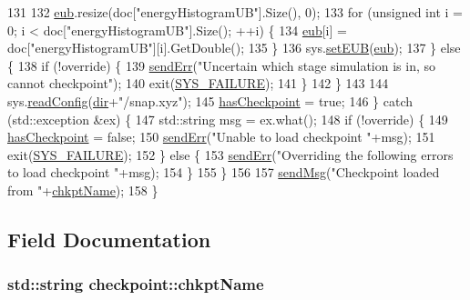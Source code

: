 \begin{DoxyCode}
131 
132             \hyperlink{classcheckpoint_a7071b01d0936873321d0a706e761b6ac}{eub}.resize(doc[\textcolor{stringliteral}{"energyHistogramUB"}].Size(), 0);
133             \textcolor{keywordflow}{for} (\textcolor{keywordtype}{unsigned} \textcolor{keywordtype}{int} i = 0; i < doc[\textcolor{stringliteral}{"energyHistogramUB"}].Size(); ++i) \{
134                 \hyperlink{classcheckpoint_a7071b01d0936873321d0a706e761b6ac}{eub}[i] = doc[\textcolor{stringliteral}{"energyHistogramUB"}][i].GetDouble();
135             \}
136             sys.\hyperlink{classsim_system_ab894de5ccd37efa97ae799f1dc1875a1}{setEUB}(\hyperlink{classcheckpoint_a7071b01d0936873321d0a706e761b6ac}{eub});
137         \} \textcolor{keywordflow}{else} \{
138             \textcolor{keywordflow}{if} (!\textcolor{keyword}{override}) \{
139                 \hyperlink{utilities_8cpp_a6dacf3c3c19aa1e13a4d5a148fe5114e}{sendErr}(\textcolor{stringliteral}{"Uncertain which stage simulation is in, so cannot checkpoint"});
140                 exit(\hyperlink{global_8h_a428dfe1ef0a6ff4b1fdebf275f6aff2e}{SYS\_FAILURE});
141             \}
142         \}
143 
144         sys.\hyperlink{classsim_system_a3161d95bbb800d5d95a732ac5fc32b95}{readConfig}(\hyperlink{classcheckpoint_a0e0f999ee8e0b09541e9131baa8a591d}{dir}+\textcolor{stringliteral}{"/snap.xyz"});
145         \hyperlink{classcheckpoint_aa75f306fcb0c2360d948fa3a61adfed5}{hasCheckpoint} = \textcolor{keyword}{true};
146     \} \textcolor{keywordflow}{catch} (std::exception &ex) \{
147         std::string msg = ex.what();
148         \textcolor{keywordflow}{if} (!\textcolor{keyword}{override}) \{
149             \hyperlink{classcheckpoint_aa75f306fcb0c2360d948fa3a61adfed5}{hasCheckpoint} = \textcolor{keyword}{false};
150             \hyperlink{utilities_8cpp_a6dacf3c3c19aa1e13a4d5a148fe5114e}{sendErr}(\textcolor{stringliteral}{"Unable to load checkpoint "}+msg);
151             exit(\hyperlink{global_8h_a428dfe1ef0a6ff4b1fdebf275f6aff2e}{SYS\_FAILURE});
152         \} \textcolor{keywordflow}{else} \{
153             \hyperlink{utilities_8cpp_a6dacf3c3c19aa1e13a4d5a148fe5114e}{sendErr}(\textcolor{stringliteral}{"Overriding the following errors to load checkpoint "}+msg);
154         \}
155     \}
156 
157     \hyperlink{utilities_8cpp_a08974c73a5b36c28b8ad1ef47fca77b0}{sendMsg}(\textcolor{stringliteral}{"Checkpoint loaded from "}+\hyperlink{classcheckpoint_a477eea21621f066889660ed426dc800f}{chkptName});
158 \}
\end{DoxyCode}


\subsection{Field Documentation}
\hypertarget{classcheckpoint_a477eea21621f066889660ed426dc800f}{
\subsubsection[{chkpt\-Name}]{\setlength{\rightskip}{0pt plus 5cm}std\-::string checkpoint\-::chkpt\-Name}}\label{classcheckpoint_a477eea21621f066889660ed426dc800f}


